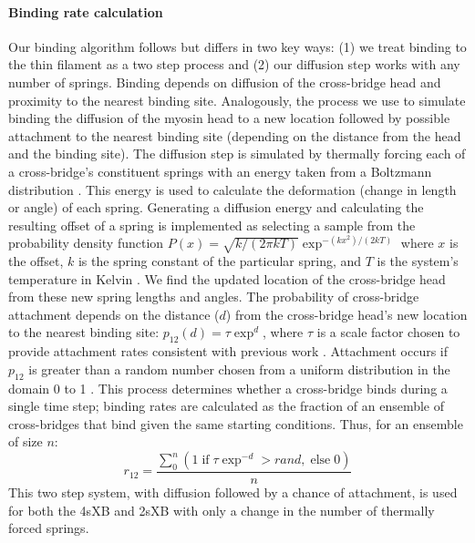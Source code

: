 \documentclass[]{article}
\begin{document}
\paragraph{Binding rate calculation} %
Our binding algorithm follows \citet{Tanner2007} but differs in two key ways: (1) we treat binding to the thin filament as a two step process and (2) our diffusion step works with any number of springs.
Binding depends on diffusion of the cross-bridge head and proximity to the nearest binding site.
Analogously, the process we use to simulate binding the diffusion of the myosin head to a new location followed by possible attachment to the nearest binding site (depending on the distance from the head and the binding site).
The diffusion step is simulated by thermally forcing each of a cross-bridge's constituent springs with an energy taken from a Boltzmann distribution \citep{BergBook, HowardBook}.
This energy is used to calculate the deformation (change in length or angle) of each spring. 
Generating a diffusion energy and calculating the resulting offset of a spring is implemented as selecting a sample from the probability density function $P(x) = \sqrt{k / (2 \pi kT)} \exp^{-(k x^2)/(2 kT)}$ where $x$ is the offset, $k$ is the spring constant of the particular spring, and $T$ is the system's temperature in Kelvin  \citep{DillBook, HowardBook}. %
We find the updated location of the cross-bridge head from these new spring lengths and angles.
The probability of cross-bridge attachment depends on the distance ($d$) from the cross-bridge head's new location to the nearest binding site: $p_{12}(d) = \tau \exp ^{d}$, where $\tau$ is a scale factor chosen to provide attachment rates consistent with previous work \citep{Daniel1998, Tanner2007}.
Attachment occurs if $p_{12}$ is greater than a random number chosen from a uniform distribution in the domain 0 to 1 \citep{Tanner2007}.
This process determines whether a cross-bridge binds during a single time step; binding rates are calculated as the fraction of an ensemble of cross-bridges that bind given the same starting conditions. 
Thus, for an ensemble of size $n$: 
$$r_{12} =  \frac{\sum_0^n \left( 1\; \textrm{if}\; \tau \exp^{-d}>rand ,\; \textrm{else}\; 0 \right)}{n}$$
This two step system, with diffusion followed by a chance of attachment, is used for both the 4sXB and 2sXB with only a change in the number of thermally forced springs.
\end{document}
